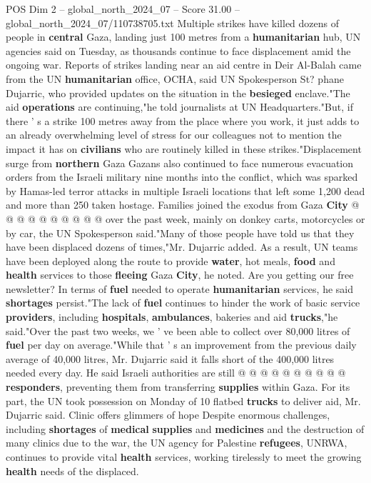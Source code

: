 \begin{textsample}{POS Dim 2 – global\_north\_2024\_07 – Score 31.00 – global\_north\_2024\_07/110738705.txt}  \label{ex:f2_pos_382}
Multiple strikes have killed dozens of people in \textbf{central} Gaza, landing just 100 metres from a \textbf{humanitarian} hub, UN agencies said on Tuesday, as thousands continue to face displacement amid the ongoing war.
Reports of strikes landing near an aid centre in Deir Al-Balah came from the UN \textbf{humanitarian} office, OCHA, said UN Spokesperson St? phane Dujarric, who provided updates on the situation in the \textbf{besieged} enclave."The aid \textbf{operations} are continuing,"he told journalists at UN Headquarters."But, if there ' s a strike 100 metres away from the place where you work, it just adds to an already overwhelming level of stress for our colleagues not to mention the impact it has on \textbf{civilians} who are routinely killed in these strikes."Displacement surge from \textbf{northern} Gaza Gazans also continued to face numerous evacuation orders from the Israeli military nine months into the conflict, which was sparked by Hamas-led terror attacks in multiple Israeli locations that left some 1,200 dead and more than 250 taken hostage.
Families joined the exodus from Gaza \textbf{City} @ @ @ @ @ @ @ @ @ @ over the past week, mainly on donkey carts, motorcycles or by car, the UN Spokesperson said."Many of those people have told us that they have been displaced dozens of times,"Mr.
Dujarric added.
As a result, UN teams have been deployed along the route to provide \textbf{water}, hot meals, \textbf{food} and \textbf{health} services to those \textbf{fleeing} Gaza \textbf{City}, he noted.
Are you getting our free newsletter?
In terms of \textbf{fuel} needed to operate \textbf{humanitarian} services, he said \textbf{shortages} persist."The lack of \textbf{fuel} continues to hinder the work of basic service \textbf{providers}, including \textbf{hospitals}, \textbf{ambulances}, bakeries and aid \textbf{trucks},"he said."Over the past two weeks, we ' ve been able to collect over 80,000 litres of \textbf{fuel} per day on average."While that ' s an improvement from the previous daily average of 40,000 litres, Mr.
Dujarric said it falls short of the 400,000 litres needed every day.
He said Israeli authorities are still @ @ @ @ @ @ @ @ @ @ \textbf{responders}, preventing them from transferring \textbf{supplies} within Gaza.
For its part, the UN took possession on Monday of 10 flatbed \textbf{trucks} to deliver aid, Mr.
Dujarric said.
Clinic offers glimmers of hope Despite enormous challenges, including \textbf{shortages} of \textbf{medical} \textbf{supplies} and \textbf{medicines} and the destruction of many clinics due to the war, the UN agency for Palestine \textbf{refugees}, UNRWA, continues to provide vital \textbf{health} services, working tirelessly to meet the growing \textbf{health} needs of the displaced.

\end{textsample}

